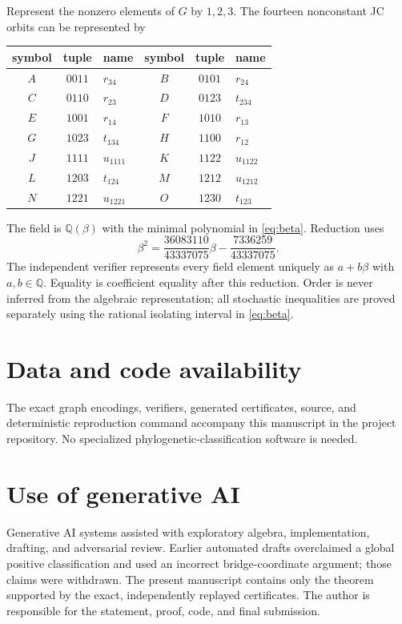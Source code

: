 \documentclass[11pt]{article}
\theoremstyle{remark}
\begin{document}
Represent the nonzero elements of $G$ by $1,2,3$.  The fourteen nonconstant
JC orbits can be represented by
\begin{center}
\begin{tabular}{ccl@{\qquad}ccl}
\toprule
symbol & tuple & name & symbol & tuple & name\\
\midrule
$A$&$0011$&$r_{34}$ & $B$&$0101$&$r_{24}$\\
$C$&$0110$&$r_{23}$ & $D$&$0123$&$t_{234}$\\
$E$&$1001$&$r_{14}$ & $F$&$1010$&$r_{13}$\\
$G$&$1023$&$t_{134}$ & $H$&$1100$&$r_{12}$\\
$J$&$1111$&$u_{1111}$ & $K$&$1122$&$u_{1122}$\\
$L$&$1203$&$t_{124}$ & $M$&$1212$&$u_{1212}$\\
$N$&$1221$&$u_{1221}$ & $O$&$1230$&$t_{123}$\\
\bottomrule
\end{tabular}
\end{center}

The field is $\mathbb Q(\beta)$ with the minimal polynomial in
\eqref{eq:beta}.  Reduction uses
\[
\beta^2=\frac{36083110}{43337075}\beta-
\frac{7336259}{43337075}.
\]
The independent verifier represents every field element uniquely as
$a+b\beta$ with $a,b\in\mathbb Q$.  Equality is coefficient equality after
this reduction.  Order is never inferred from the algebraic representation;
all stochastic inequalities are proved separately using the rational
isolating interval in \eqref{eq:beta}.

\section*{Data and code availability}

The exact graph encodings, verifiers, generated certificates, source, and
deterministic reproduction command accompany this manuscript in the project
repository.  No specialized phylogenetic-classification software is needed.

\section*{Use of generative AI}

Generative AI systems assisted with exploratory algebra, implementation,
drafting, and adversarial review.  Earlier automated drafts overclaimed a
global positive classification and used an incorrect bridge-coordinate
argument; those claims were withdrawn.  The present manuscript contains only
the theorem supported by the exact, independently replayed certificates.  The
author is responsible for the statement, proof, code, and final submission.
\end{document}
